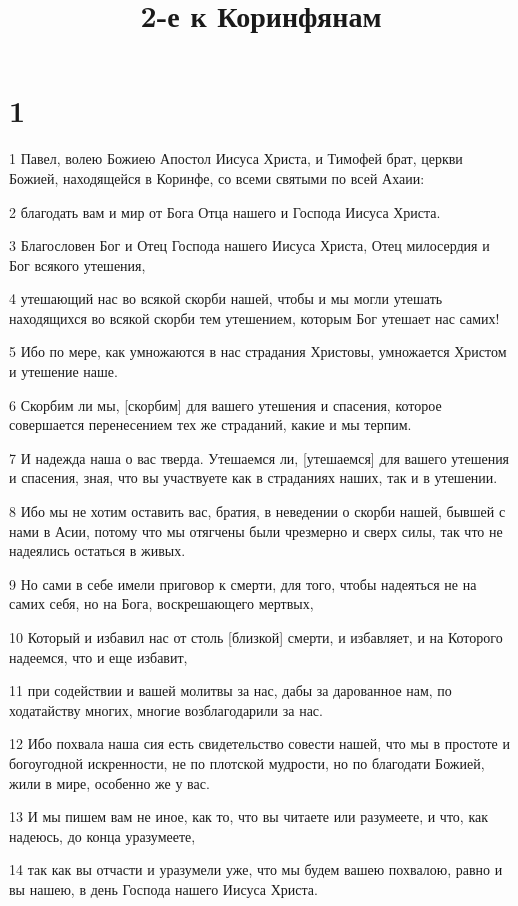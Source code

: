 

\title{2-е к Коринфянам}


\chapter{1}

\par 1 Павел, волею Божиею Апостол Иисуса Христа, и Тимофей брат, церкви Божией, находящейся в Коринфе, со всеми святыми по всей Ахаии:
\par 2 благодать вам и мир от Бога Отца нашего и Господа Иисуса Христа.
\par 3 Благословен Бог и Отец Господа нашего Иисуса Христа, Отец милосердия и Бог всякого утешения,
\par 4 утешающий нас во всякой скорби нашей, чтобы и мы могли утешать находящихся во всякой скорби тем утешением, которым Бог утешает нас самих!
\par 5 Ибо по мере, как умножаются в нас страдания Христовы, умножается Христом и утешение наше.
\par 6 Скорбим ли мы, [скорбим] для вашего утешения и спасения, которое совершается перенесением тех же страданий, какие и мы терпим.
\par 7 И надежда наша о вас тверда. Утешаемся ли, [утешаемся] для вашего утешения и спасения, зная, что вы участвуете как в страданиях наших, так и в утешении.
\par 8 Ибо мы не хотим оставить вас, братия, в неведении о скорби нашей, бывшей с нами в Асии, потому что мы отягчены были чрезмерно и сверх силы, так что не надеялись остаться в живых.
\par 9 Но сами в себе имели приговор к смерти, для того, чтобы надеяться не на самих себя, но на Бога, воскрешающего мертвых,
\par 10 Который и избавил нас от столь [близкой] смерти, и избавляет, и на Которого надеемся, что и еще избавит,
\par 11 при содействии и вашей молитвы за нас, дабы за дарованное нам, по ходатайству многих, многие возблагодарили за нас.
\par 12 Ибо похвала наша сия есть свидетельство совести нашей, что мы в простоте и богоугодной искренности, не по плотской мудрости, но по благодати Божией, жили в мире, особенно же у вас.
\par 13 И мы пишем вам не иное, как то, что вы читаете или разумеете, и что, как надеюсь, до конца уразумеете,
\par 14 так как вы отчасти и уразумели уже, что мы будем вашею похвалою, равно и вы нашею, в день Господа нашего Иисуса Христа.
